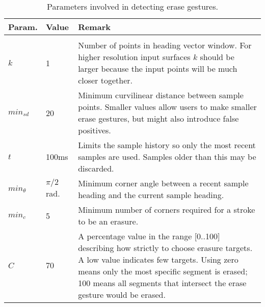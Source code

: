
\begin{table}%
\centering
\begin{tabular}{p{1.5cm}| p{1.5cm} | p{12cm}}
\textbf{Param.} & \textbf{Value} & \textbf{Remark} 
\\ \hline
 & &
\\
$k$ &

1 &

Number of points in heading vector window. For higher resolution input
surfaces $k$ should be larger because the input points will be much
closer together.

\\

$min_{sd}$ & 

20 &

Minimum curvilinear distance between sample points. Smaller values
allow users to make smaller erase gestures, but might also introduce
false positives. 

\\

$t$ &

100ms &

Limits the sample history so only the most recent samples are
used. Samples older than this may be discarded.

\\

$min_\theta$ &

$\pi/2$ rad. &

Minimum corner angle between a recent sample heading and the current
sample heading. 

\\

$min_c$ &

5 &

Minimum number of corners required for a stroke to be an erasure.

\\

$C$ &

$70$ &

A percentage value in the range [0..100] describing how strictly to
choose erasure targets. A low value indicates few targets. Using zero
means only the most specific segment is erased; 100 means all segments
that intersect the erase gesture would be erased.

\end{tabular}
\caption[Erase Gesture Parameters]{Parameters involved in detecting erase gestures.}
\label{tab:erase-params}
\end{table}
